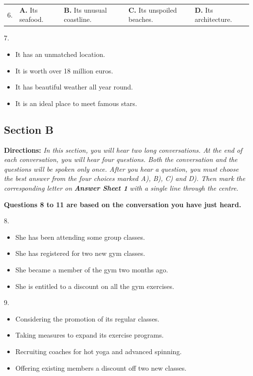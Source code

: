 \documentclass[UTF8,11pt]{ctexart}
\begin{document}
\noindent\begin{tabularx}{\linewidth}{@{}lXXXX@{}}6. & \textbf{A.} Its seafood. & \textbf{B.} Its unusual coastline. & \textbf{C.} Its unspoiled beaches. & \textbf{D.} Its architecture.\\\end{tabularx}\par

7.


\begin{itemize}[leftmargin=2em,itemsep=.2em,topsep=.4em]\item[A.] It has an unmatched location.
\item[B.] It is worth over 18 million euros.
\item[C.] It has beautiful weather all year round.
\item[D.] It is an ideal place to meet famous stars.
\end{itemize}

\subsection*{\textbf{Section B}}


\textbf{Directions:} \textit{In this section, you will hear two long conversations. At the end of each conversation, you will} \textit{hear four questions. Both the conversation and the questions will be spoken only once. After you hear a} \textit{question, you must choose the best answer from the four choices marked A), B), C) and D). Then mark the} \textit{corresponding letter on }\textbf{\textit{Answer Sheet 1}}\textit{ with a single line through the centre.}


\textbf{Questions 8 to 11 are based on the conversation you have just heard.}


8.


\begin{itemize}[leftmargin=2em,itemsep=.2em,topsep=.4em]\item[A.] She has been attending some group classes.
\item[B.] She has registered for two new gym classes.
\item[C.] She became a member of the gym two months ago.
\item[D.] She is entitled to a discount on all the gym exercises.
\end{itemize}

9.


\begin{itemize}[leftmargin=2em,itemsep=.2em,topsep=.4em]\item[A.] Considering the promotion of its regular classes.
\item[B.] Taking measures to expand its exercise programs.
\item[C.] Recruiting coaches for hot yoga and advanced spinning.
\item[D.] Offering existing members a discount off two new classes.
\end{itemize}
\end{document}
